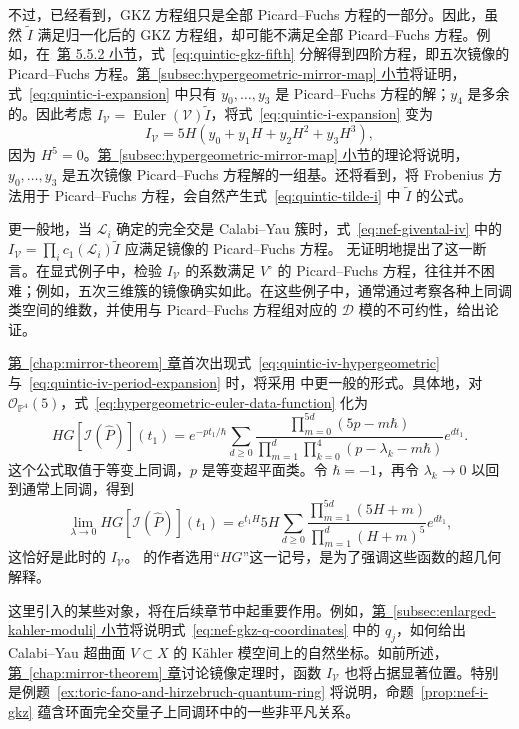 不过，已经看到，GKZ 方程组只是全部 Picard--Fuchs 方程的一部分。因此，虽然 $\widetilde I$ 满足归一化后的 GKZ 方程组，却可能不满足全部 Picard--Fuchs 方程。例如，在~\hyperref[subsec:toric-gkz]{第 5.5.2 小节}，式~\eqref{eq:quintic-gkz-fifth} 分解得到四阶方程，即五次镜像的 Picard--Fuchs 方程。\hyperref[subsec:hypergeometric-mirror-map]{第~\ref*{subsec:hypergeometric-mirror-map} 小节}将证明，式~\eqref{eq:quintic-i-expansion} 中只有 $y_0,\ldots,y_3$ 是 Picard--Fuchs 方程的解；$y_4$ 是多余的。因此考虑 $I_{\mathcal V}=\operatorname{Euler}(\mathcal V)\widetilde I$，将式~\eqref{eq:quintic-i-expansion} 变为
\begin{equation}\label{eq:quintic-iv-period-expansion}
I_{\mathcal V}=5H(y_0+y_1H+y_2H^2+y_3H^3),
\end{equation}
因为 $H^5=0$。\hyperref[subsec:hypergeometric-mirror-map]{第~\ref*{subsec:hypergeometric-mirror-map} 小节}的理论将说明，$y_0,\ldots,y_3$ 是五次镜像 Picard--Fuchs 方程解的一组基。还将看到，将 Frobenius 方法用于 Picard--Fuchs 方程，会自然产生式~\eqref{eq:quintic-tilde-i} 中 $\widetilde I$ 的公式。

更一般地，当 $\mathcal L_i$ 确定的完全交是 Calabi--Yau 簇时，式~\eqref{eq:nef-givental-iv} 中的
$I_{\mathcal V}=\prod_i c_1(\mathcal L_i)\widetilde I$ 应满足镜像的 Picard--Fuchs 方程。 无证明地提出了这一断言。在显式例子中，检验 $I_{\mathcal V}$ 的系数满足 $V^\circ$ 的 Picard--Fuchs 方程，往往并不困难；例如，五次三维簇的镜像确实如此。在这些例子中，通常通过考察各种上同调类空间的维数，并使用与 Picard--Fuchs 方程组对应的 $\mathcal D$ 模的不可约性，给出论证。

\hyperref[chap:mirror-theorem]{第~\ref*{chap:mirror-theorem} 章}首次出现式~\eqref{eq:quintic-iv-hypergeometric} 与~\eqref{eq:quintic-iv-period-expansion} 时，将采用  中更一般的形式。具体地，对 $\mathcal O_{\mathbb P^4}(5)$，式~\eqref{eq:hypergeometric-euler-data-function} 化为
\[
HG[\mathcal I(\widehat P)](t_1)
=e^{-pt_1/\hbar}\sum_{d\geq0}
\frac{\prod_{m=0}^{5d}(5p-m\hbar)}
{\prod_{m=1}^{d}\prod_{k=0}^{4}(p-\lambda_k-m\hbar)}e^{dt_1}.
\]
这个公式取值于等变上同调，$p$ 是等变超平面类。令 $\hbar=-1$，再令 $\lambda_k\to0$ 以回到通常上同调，得到
\[
\lim_{\lambda\to0}HG[\mathcal I(\widehat P)](t_1)
=e^{t_1H}5H\sum_{d\geq0}
\frac{\prod_{m=1}^{5d}(5H+m)}{\prod_{m=1}^{d}(H+m)^5}e^{dt_1},
\]
这恰好是此时的 $I_{\mathcal V}$。 的作者选用“$HG$”这一记号，是为了强调这些函数的超几何解释。

这里引入的某些对象，将在后续章节中起重要作用。例如，\hyperref[subsec:enlarged-kahler-moduli]{第~\ref*{subsec:enlarged-kahler-moduli} 小节}将说明式~\eqref{eq:nef-gkz-q-coordinates} 中的 $q_j$，如何给出 Calabi--Yau 超曲面 $V\subset X$ 的 Kähler 模空间上的自然坐标。如前所述，\hyperref[chap:mirror-theorem]{第~\ref*{chap:mirror-theorem} 章}讨论镜像定理时，函数 $I_{\mathcal V}$ 也将占据显著位置。特别是例题~\ref{ex:toric-fano-and-hirzebruch-quantum-ring} 将说明，命题~\ref{prop:nef-i-gkz} 蕴含环面完全交量子上同调环中的一些非平凡关系。

